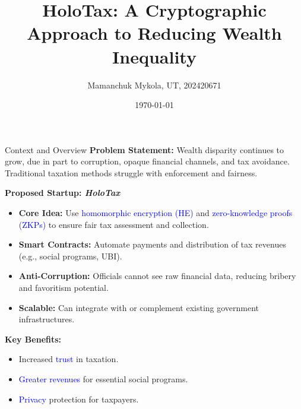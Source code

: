 \documentclass{beamer}
\title[HoloTax]{\Large HoloTax: A Cryptographic Approach to Reducing Wealth Inequality}
\author{Mamanchuk Mykola, UT, 202420671}
\date{\today}
\begin{document}
\begin{frame}{Context and Overview}
\small
\textbf{Problem Statement:}  
Wealth disparity continues to grow, due in part to corruption, opaque financial channels, and tax avoidance. Traditional taxation methods struggle with enforcement and fairness.

\vspace{0.5em}
\textbf{Proposed Startup: \emph{HoloTax}}  
\begin{itemize}
  \item \textbf{Core Idea:} Use \textcolor{blue}{homomorphic encryption (HE)} and \textcolor{blue}{zero-knowledge proofs (ZKPs)} to ensure fair tax assessment and collection.
  \item \textbf{Smart Contracts:} Automate payments and distribution of tax revenues (e.g., social programs, UBI).
  \item \textbf{Anti-Corruption:} Officials cannot see raw financial data, reducing bribery and favoritism potential.
  \item \textbf{Scalable:} Can integrate with or complement existing government infrastructures.
\end{itemize}

\textbf{Key Benefits:}
\begin{itemize}
  \item Increased \textcolor{blue}{trust} in taxation.
  \item \textcolor{blue}{Greater revenues} for essential social programs.
  \item \textcolor{blue}{Privacy} protection for taxpayers.
\end{itemize}
\end{frame}
\end{document}
